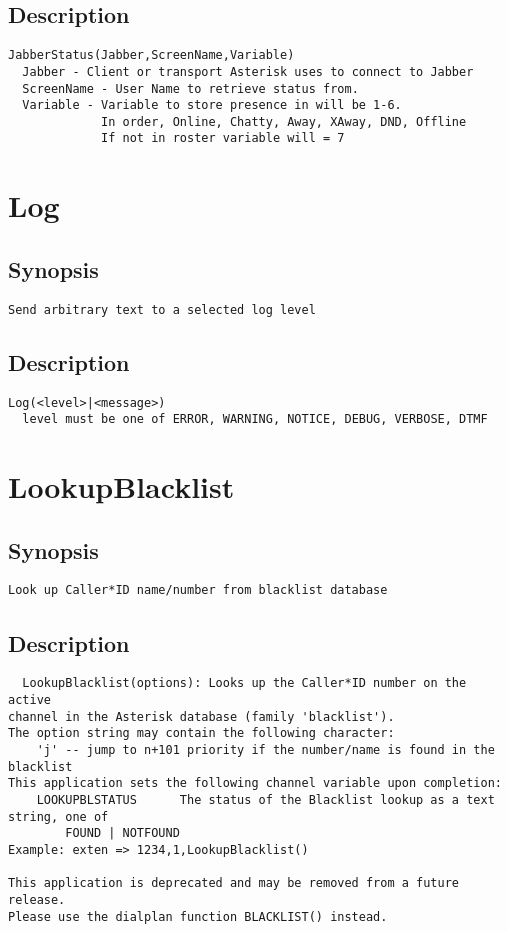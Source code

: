 \subsection{Description}
\begin{verbatim}
JabberStatus(Jabber,ScreenName,Variable)
  Jabber - Client or transport Asterisk uses to connect to Jabber
  ScreenName - User Name to retrieve status from.
  Variable - Variable to store presence in will be 1-6.
             In order, Online, Chatty, Away, XAway, DND, Offline
             If not in roster variable will = 7

\end{verbatim}


\section{Log}
\subsection{Synopsis}
\begin{verbatim}
Send arbitrary text to a selected log level
\end{verbatim}
\subsection{Description}
\begin{verbatim}
Log(<level>|<message>)
  level must be one of ERROR, WARNING, NOTICE, DEBUG, VERBOSE, DTMF

\end{verbatim}


\section{LookupBlacklist}
\subsection{Synopsis}
\begin{verbatim}
Look up Caller*ID name/number from blacklist database
\end{verbatim}
\subsection{Description}
\begin{verbatim}
  LookupBlacklist(options): Looks up the Caller*ID number on the active
channel in the Asterisk database (family 'blacklist').  
The option string may contain the following character:
	'j' -- jump to n+101 priority if the number/name is found in the blacklist
This application sets the following channel variable upon completion:
	LOOKUPBLSTATUS		The status of the Blacklist lookup as a text string, one of
		FOUND | NOTFOUND
Example: exten => 1234,1,LookupBlacklist()

This application is deprecated and may be removed from a future release.
Please use the dialplan function BLACKLIST() instead.

\end{verbatim}



